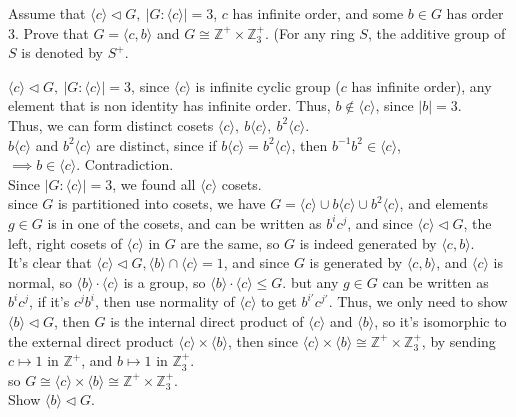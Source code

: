 \documentclass{article}
\begin{document}
\pagebreak

\begin{homeworkProblem}
    Assume that $\langle c \rangle \lhd G, \ \lvert G : \langle c \rangle \rvert = 3$,
    $c$ has infinite order, and some $b \in G$
    has order $3$. 
    Prove that $G = \langle c, b \rangle$
    and $G \cong \mathbb{Z}^{+} \times \mathbb{Z}_3^{+}$.
    (For any ring $S$, the additive group of $S$
    is denoted by $S^{+}$.\\

    \solution

    $\langle c \rangle \lhd G, \ \lvert G : \langle c \rangle \rvert = 3$,
    since $\langle c \rangle$ is infinite cyclic group
    ($c$ has infinite order), any element that 
    is non identity has infinite order. Thus,
    $b \not\in \langle c \rangle$, since $\lvert b \rvert = 3.$\\
    Thus, we can form distinct cosets $\langle c \rangle, \ b \langle c \rangle, \ b^2 \langle c \rangle$.\\
    $b \langle c \rangle$ and $b^2 \langle c \rangle$ are distinct, 
    since if $b \langle c \rangle = b^2 \langle c \rangle$,
    then $b^{-1} b^2 \in \langle c \rangle$,\\
    $\implies b \in \langle c \rangle$. Contradiction.\\
    Since $\lvert G: \langle c \rangle \rvert = 3$,
    we found all $\langle c \rangle$ cosets.\\
    since $G$ is partitioned into cosets,
    we have $G = \langle c \rangle \cup b \langle c \rangle \cup b^2 \langle c \rangle$,
    and elements $g \in G$ is in one of the cosets,
    and can be written as $b^i c^j$,
    and since $\langle c \rangle \lhd G$,
    the left, right cosets of $\langle c \rangle$ in $G$
    are the same, so $G$ is indeed generated by $\langle c, b \rangle$.\\
    It's clear that $\langle c \rangle \lhd G, \langle b \rangle \cap \langle c \rangle = 1$,
    and since $G$ is generated by $\langle c, b \rangle$, 
    and $\langle c \rangle$ is normal,
    so $\langle b \rangle \cdot \langle c \rangle$ is a group,
    so $\langle b \rangle \cdot \langle c \rangle \leq G$.
    but any $g \in G$ can be written as $b^i c^j$, if it's 
    $c^j b^i$, then use normality of $\langle c \rangle$ 
    to get $b^{i'} c^{j'}$. Thus, we only need to show 
    $\langle b \rangle \lhd G$,
    then $G$ is the internal direct product of $\langle c \rangle$ and 
    $\langle b \rangle$, so it's isomorphic to the 
    external direct product $\langle c \rangle \times \langle b \rangle$,
    then since $\langle c \rangle \times \langle b \rangle \cong \mathbb{Z}^{+} \times \mathbb{Z}_3^{+}$,
    by sending $c \mapsto 1$ in $\mathbb{Z}^{+}$,
    and $b \mapsto 1$ in $\mathbb{Z}_3^{+}$.\\
    so $G \cong \langle c \rangle \times \langle b \rangle \cong \mathbb{Z}^{+} \times \mathbb{Z}_3^{+}$.\\
    Show $\langle b \rangle \lhd G$.\\








\end{homeworkProblem}
\end{document}
